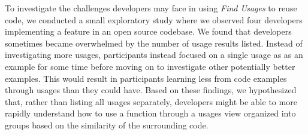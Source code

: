 \documentclass[conference]{IEEEtran}
\begin{document}



To investigate the challenges developers may face in using \textit{Find Usages} to reuse code, we conducted a small exploratory study where we observed four developers implementing a feature in an open source codebase. We found that developers sometimes became overwhelmed by the number of usage results listed. Instead of investigating more usages, participants instead focused on a single usage as as an example for some time before moving on to investigate other potentially better examples. This would result in participants learning less from code examples through usages than they could have.
Based on these findings, we hypothesized that, rather than listing all usages separately, developers might be able to more rapidly understand how to use a function through a usages view organized into groups based on the similarity of the surrounding code. \par
\end{document}
